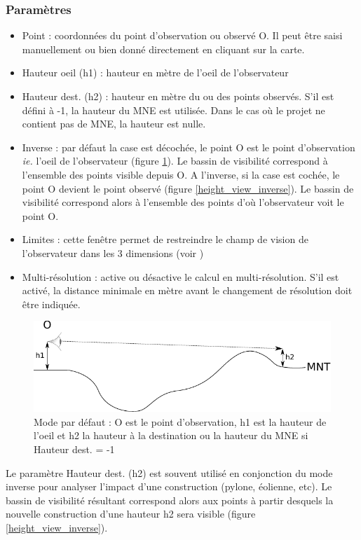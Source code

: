 \documentclass{report}
\begin{document}
\subsubsection{Paramètres}
\label{viewshed_param}
\begin{itemize}
	\item Point : coordonnées du point d'observation ou observé O. Il peut être saisi manuellement ou bien donné directement en cliquant sur la carte.
	\item Hauteur oeil (h1) : hauteur en mètre de l'oeil de l'observateur
	\item Hauteur dest. (h2) : hauteur en mètre du ou des points observés. S'il est défini à -1, la hauteur du MNE est utilisée. Dans le cas où le projet ne contient pas de MNE, la hauteur est nulle.
	\item Inverse : par défaut la case est décochée, le point O est le point d'observation \textit{ie.} l'oeil de l'observateur (figure \ref{height_view}). Le bassin de visibilité correspond à l'ensemble des points visible depuis O. A l'inverse, si la case est cochée, le point O devient le point observé (figure \ref{height_view_inverse}). Le bassin de visibilité correspond alors à l'ensemble des points d'où l'observateur voit le point O.
	\item Limites : cette fenêtre permet de restreindre le champ de vision de l'observateur dans les 3 dimensions (voir )
	\item Multi-résolution : active ou désactive le calcul en multi-résolution. S'il est activé, la distance minimale en mètre avant le changement de résolution doit être indiquée.
\end{itemize}


\begin{figure}[H]
	\includegraphics{img/height_view.pdf} 
	\caption{Mode par défaut : O est le point d'observation, h1 est la hauteur de l'oeil et h2 la hauteur à la destination ou la hauteur du MNE si Hauteur dest. = -1}
	\label{height_view}
\end{figure}

Le paramètre Hauteur dest. (h2) est souvent utilisé en conjonction du mode inverse pour analyser l'impact d'une construction (pylone, éolienne, etc). Le bassin de visibilité résultant correspond alors aux points à partir desquels la nouvelle construction d'une hauteur h2 sera visible (figure \ref{height_view_inverse}).
\end{document}
